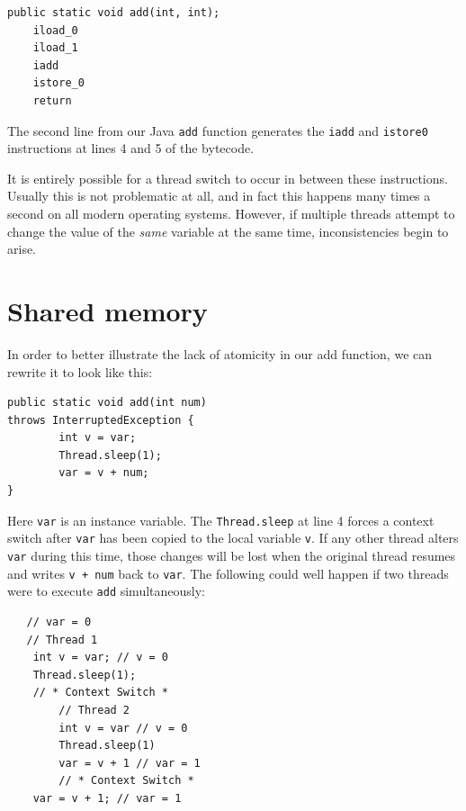 \documentclass[a4paper,12pt]{kth-mag}
\begin{document}
\begin{listing}[H]
	\begin{verbatim}
public static void add(int, int);
	iload_0
	iload_1
	iadd
	istore_0
	return
  	\end{verbatim}
\end{listing}

The second line from our Java \texttt{add} function generates the \texttt{iadd} and \texttt{istore0} instructions at lines 4 and 5 of the bytecode. 

It is entirely possible for a thread switch to occur in between these instructions. Usually this is not problematic at all, and in fact this happens many times a second on all modern operating systems. However, if multiple threads attempt to change the value of the \textit{same} variable at the same time, inconsistencies begin to arise. 

\section{Shared memory}

In order to better illustrate the lack of atomicity in our add function, we can rewrite it to look like this:

\begin{listing}[H]
	\begin{verbatim}
public static void add(int num) 
throws InterruptedException {
        int v = var;
        Thread.sleep(1);
        var = v + num;
}
  	\end{verbatim}
\end{listing}

Here \texttt{var} is an instance variable. The \texttt{Thread.sleep} at line 4 forces a context switch after \texttt{var} has been copied to the local variable \texttt{v}. If any other thread alters \texttt{var} during this time, those changes will be lost when the original thread resumes and writes \texttt{v + num} back to \texttt{var}. The following could well happen if two threads were to execute \texttt{add} simultaneously:

\begin{listing}[H]
	\begin{verbatim}
   // var = 0
   // Thread 1
    int v = var; // v = 0
    Thread.sleep(1);
    // * Context Switch *
        // Thread 2
        int v = var // v = 0
        Thread.sleep(1)
        var = v + 1 // var = 1
        // * Context Switch *
    var = v + 1; // var = 1
  	\end{verbatim}
\end{listing}
\end{document}
